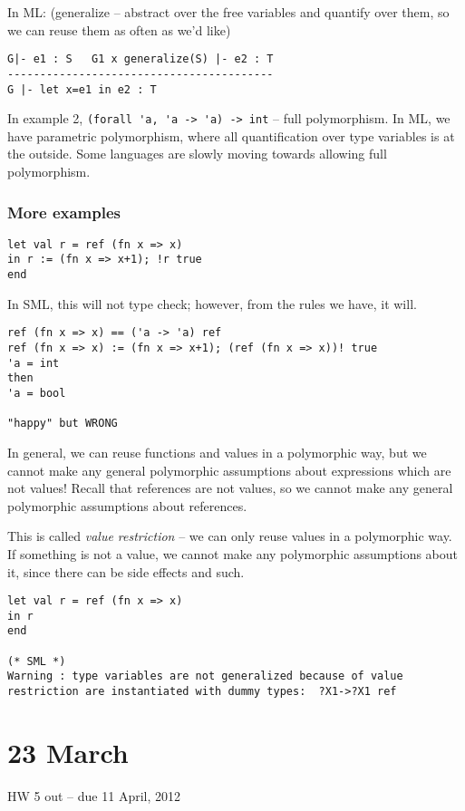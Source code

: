 \documentclass[11pt]{article}
\begin{document}
In ML:
(generalize -- abstract over the free variables and quantify over them, so we can reuse them as often as we'd like)
\begin{verbatim}
G|- e1 : S   G1 x generalize(S) |- e2 : T
-----------------------------------------
G |- let x=e1 in e2 : T
\end{verbatim}

In example 2, \verb~(forall 'a, 'a -> 'a) -> int~ -- full polymorphism. In ML, we have parametric polymorphism, where all quantification over type variables is at the outside. Some languages are slowly moving towards allowing full polymorphism.

\subsubsection{More examples}
\begin{verbatim}
let val r = ref (fn x => x)
in r := (fn x => x+1); !r true
end
\end{verbatim}

In SML, this will not type check; however, from the rules we have, it will.
\begin{verbatim}
ref (fn x => x) == ('a -> 'a) ref
ref (fn x => x) := (fn x => x+1); (ref (fn x => x))! true
'a = int
then
'a = bool

"happy" but WRONG
\end{verbatim}
In general, we can reuse functions and values in a polymorphic way, but we cannot make any general polymorphic assumptions about expressions which are not values! Recall that references are not values, so we cannot make any general polymorphic assumptions about references. 

This is called \emph{value restriction} -- we can only reuse values in a polymorphic way. If something is not a value, we cannot make any polymorphic assumptions about it, since there can be side effects and such.

\begin{verbatim}
let val r = ref (fn x => x)
in r
end

(* SML *)
Warning : type variables are not generalized because of value restriction are instantiated with dummy types:  ?X1->?X1 ref
\end{verbatim}

\section{23 March}
HW 5 out -- due 11 April, 2012
\end{document}
